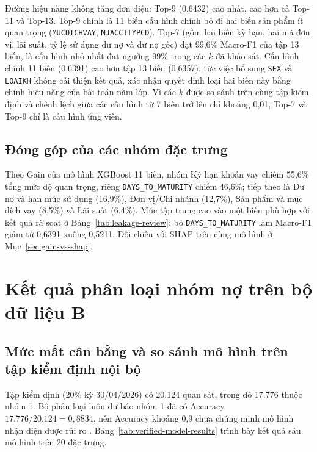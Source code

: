Đường hiệu năng không tăng đơn điệu: Top-9 (0,6432) cao nhất, cao hơn cả Top-11 và Top-13. Top-9 chính là 11 biến cấu hình chính bỏ đi hai biến sản phẩm ít quan trọng (\texttt{MUCDICHVAY}, \mbox{\texttt{MJACCTTYPCD}}). Top-7 (gồm hai biến kỳ hạn, hai mã đơn vị, lãi suất, tỷ lệ sử dụng dư nợ và dư nợ gốc) đạt 99,6\% Macro-F1 của tập 13 biến, là cấu hình nhỏ nhất đạt ngưỡng 99\% trong các $k$ đã khảo sát. Cấu hình chính 11 biến (0,6391) cao hơn tập 13 biến (0,6357), tức việc bổ sung \texttt{SEX} và \texttt{LOAIKH} không cải thiện kết quả, xác nhận quyết định loại hai biến này bằng chính hiệu năng của bài toán năm lớp. Vì các $k$ được so sánh trên cùng tập kiểm định và chênh lệch giữa các cấu hình từ 7 biến trở lên chỉ khoảng 0,01, Top-7 và Top-9 chỉ là cấu hình ứng viên.

\subsection{Đóng góp của các nhóm đặc trưng}
\label{sec:res-a-groups}

Theo Gain của mô hình XGBoost 11 biến, nhóm Kỳ hạn khoản vay chiếm 55,6\% tổng mức độ quan trọng, riêng \mbox{\texttt{DAYS\_TO\_MATURITY}} chiếm 46,6\%; tiếp theo là Dư nợ và hạn mức sử dụng (16,9\%), Đơn vị/Chi nhánh (12,7\%), Sản phẩm và mục đích vay (8,5\%) và Lãi suất (6,4\%). Mức tập trung cao vào một biến phù hợp với kết quả rà soát ở Bảng~\ref{tab:leakage-review}: bỏ \mbox{\texttt{DAYS\_TO\_MATURITY}} làm Macro-F1 giảm từ 0,6391 xuống 0,5211. Đối chiếu với SHAP trên cùng mô hình ở Mục~\ref{sec:gain-vs-shap}.

\section{Kết quả phân loại nhóm nợ trên bộ dữ liệu B}

\subsection{Mức mất cân bằng và so sánh mô hình trên tập kiểm định nội bộ}
\label{sec:res-b-models}

Tập kiểm định (20\% kỳ 30/04/2026) có 20.124 quan sát, trong đó 17.776 thuộc nhóm 1. Bộ phân loại luôn dự báo nhóm 1 đã có Accuracy $17.776/20.124=0,8834$, nên Accuracy khoảng 0,9 chưa chứng minh mô hình nhận diện được rủi ro \cite{brown2012experimental}. Bảng~\ref{tab:verified-model-results} trình bày kết quả sáu mô hình trên 20 đặc trưng.

